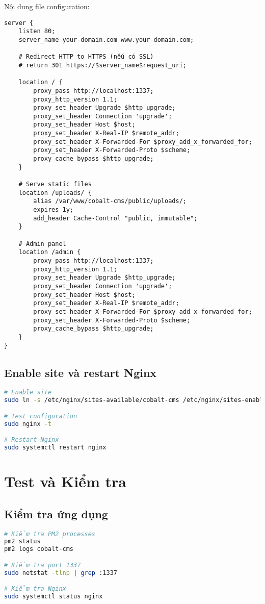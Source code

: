 \documentclass[12pt,a4paper]{article}
\begin{document}
Nội dung file configuration:
\begin{lstlisting}[language=nginx]
server {
    listen 80;
    server_name your-domain.com www.your-domain.com;

    # Redirect HTTP to HTTPS (nếu có SSL)
    # return 301 https://$server_name$request_uri;

    location / {
        proxy_pass http://localhost:1337;
        proxy_http_version 1.1;
        proxy_set_header Upgrade $http_upgrade;
        proxy_set_header Connection 'upgrade';
        proxy_set_header Host $host;
        proxy_set_header X-Real-IP $remote_addr;
        proxy_set_header X-Forwarded-For $proxy_add_x_forwarded_for;
        proxy_set_header X-Forwarded-Proto $scheme;
        proxy_cache_bypass $http_upgrade;
    }

    # Serve static files
    location /uploads/ {
        alias /var/www/cobalt-cms/public/uploads/;
        expires 1y;
        add_header Cache-Control "public, immutable";
    }

    # Admin panel
    location /admin {
        proxy_pass http://localhost:1337;
        proxy_http_version 1.1;
        proxy_set_header Upgrade $http_upgrade;
        proxy_set_header Connection 'upgrade';
        proxy_set_header Host $host;
        proxy_set_header X-Real-IP $remote_addr;
        proxy_set_header X-Forwarded-For $proxy_add_x_forwarded_for;
        proxy_set_header X-Forwarded-Proto $scheme;
        proxy_cache_bypass $http_upgrade;
    }
}
\end{lstlisting}

\subsection{Enable site và restart Nginx}
\begin{lstlisting}[language=bash]
# Enable site
sudo ln -s /etc/nginx/sites-available/cobalt-cms /etc/nginx/sites-enabled/

# Test configuration
sudo nginx -t

# Restart Nginx
sudo systemctl restart nginx
\end{lstlisting}

\section{Test và Kiểm tra}

\subsection{Kiểm tra ứng dụng}
\begin{lstlisting}[language=bash]
# Kiểm tra PM2 processes
pm2 status
pm2 logs cobalt-cms

# Kiểm tra port 1337
sudo netstat -tlnp | grep :1337

# Kiểm tra Nginx
sudo systemctl status nginx
\end{lstlisting}
\end{document}
